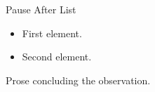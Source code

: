 \documentclass[14pt,t]{beamer}
\begin{document}
\begin{frame}{Pause After List}
\begin{itemize}
\item First element.
\item Second element.
\end{itemize}
\pause
Prose concluding the observation.
\end{frame}
\end{document}
